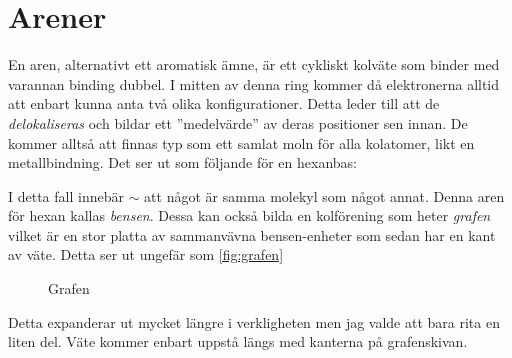 \section{Arener}
En aren, alternativt ett aromatisk ämne, är ett cykliskt kolväte som binder med varannan binding dubbel. I mitten av denna ring kommer då elektronerna alltid att enbart kunna anta två olika konfigurationer. Detta leder till att de \emph{delokaliseras} och bildar ett ''medelvärde'' av deras positioner sen innan. De kommer alltså att finnas typ som ett samlat moln för alla kolatomer, likt en metallbindning. Det ser ut som följande för en hexanbas:
\begin{figure*}[h]
    \centering
\end{figure*}

I detta fall innebär $\sim$ att något är samma molekyl som något annat. Denna aren för hexan kallas \emph{bensen}. Dessa kan också bilda en kolförening som heter \emph{grafen} vilket är en stor platta av sammanvävna bensen-enheter som sedan har en kant av väte. Detta ser ut ungefär som \vref{fig:grafen}
\begin{figure*}[h]
    \centering
    \caption{Grafen}
    \label{fig:grafen}
\end{figure*}
Detta expanderar ut mycket längre i verkligheten men jag valde att bara rita en liten del. Väte kommer enbart uppstå längs med kanterna på grafenskivan.